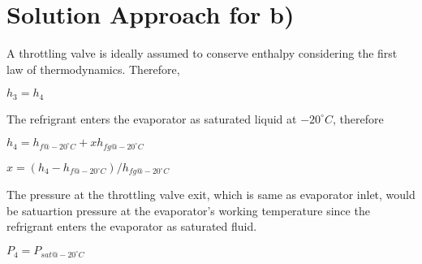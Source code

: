 \documentclass[letterpaper,10pt,english]{jupyterBook}
\begin{document}
\section{Solution Approach for b)}
\label{\detokenize{notebooks/Chapter5/CH5-Q5:solution-approach-for-b}}
\sphinxAtStartPar
A throttling valve is ideally assumed to conserve enthalpy considering the first law of thermodynamics. Therefore,

\sphinxAtStartPar
\(h_3 = h_4\)

\sphinxAtStartPar
The refrigrant enters the evaporator as saturated liquid at \(-20^{\circ}  C\), therefore

\sphinxAtStartPar
\(h_4 = h_{f@-20^{\circ}  C}+xh_{fg@-20^{\circ}  C}\)

\sphinxAtStartPar
\(x = (h_4 - h_{f@-20^{\circ}  C}) / h_{fg@-20^{\circ}  C}\)

\sphinxAtStartPar
The pressure at the throttling valve exit, which is same as evaporator inlet, would be satuartion pressure at the evaporator’s working temperature since the refrigrant enters the evaporator as saturated fluid.

\sphinxAtStartPar
\(P_4 = P_{sat@-20^{\circ}  C}\)
\end{document}
